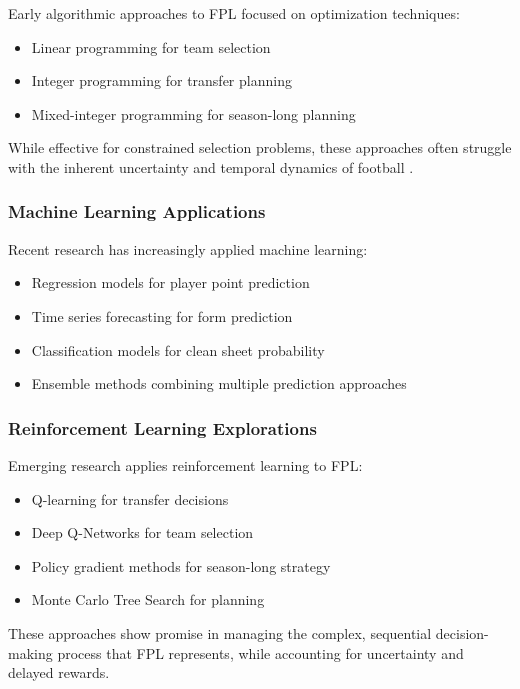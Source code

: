 Early algorithmic approaches to FPL focused on optimization techniques:
\begin{itemize}
    \item Linear programming for team selection
    \item Integer programming for transfer planning
    \item Mixed-integer programming for season-long planning
\end{itemize}

While effective for constrained selection problems, these approaches often struggle with the inherent uncertainty and temporal dynamics of football \cite{pantuso2017, rotshtein2005}.

\subsubsection{Machine Learning Applications}

Recent research has increasingly applied machine learning:
\begin{itemize}
    \item Regression models for player point prediction
    \item Time series forecasting for form prediction
    \item Classification models for clean sheet probability
    \item Ensemble methods combining multiple prediction approaches \cite{guo2017, baboota2019}
\end{itemize}

\subsubsection{Reinforcement Learning Explorations}

Emerging research applies reinforcement learning to FPL:
\begin{itemize}
    \item Q-learning for transfer decisions
    \item Deep Q-Networks for team selection
    \item Policy gradient methods for season-long strategy
    \item Monte Carlo Tree Search for planning \cite{hubacek2019, rahimian2021}
\end{itemize}

These approaches show promise in managing the complex, sequential decision-making process that FPL represents, while accounting for uncertainty and delayed rewards.

